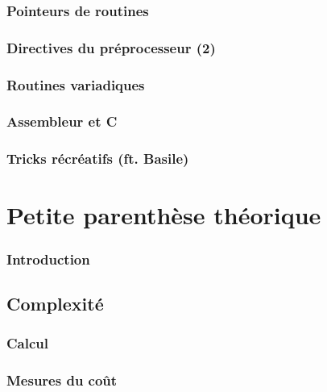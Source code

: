 \documentclass{minitelreport}
\begin{document}
\begin{refsection}
		\section{Pointeurs de routines}
			\label{sec:pointeurs_de_routines}
			
		\section{Directives du préprocesseur (2)}
			\label{sec:directives_de_pr_processeurs_2_}
			
		\section{Routines variadiques}
			\label{sec:routines_variadiques}
			
		\section{Assembleur et C}
			\label{sec:assembleur_et_c}
			
		\section{Tricks récréatifs (ft. Basile)}
			\label{sec:tricks_r_cr_atifs_ft_basile_}
			
\part{Petite parenthèse théorique}
\label{part:petite_parenthèse_théorique}
	\section*{Introduction}
	
	\chapter{Complexité}
	\label{cha:complexite}
		\section{Calcul}
			\label{sec:calcul}
			
		\section{Mesures du coût} %
			\label{sec:mesures_du_cout}
			

\end{refsection}
\end{document}

